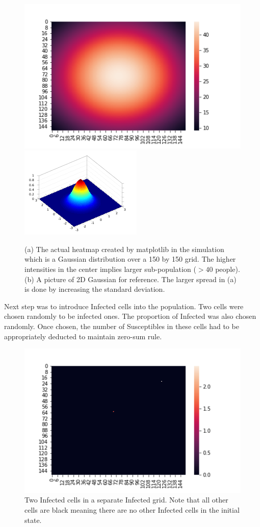 \documentclass[a4paper]{article}
\begin{document}
\begin{figure}[ht]
  \includegraphics[scale=0.4]{../population_dist.png}
  \includegraphics[scale=0.7]{../2dgauss.png}
  \centering
  \caption{(a) The actual heatmap created by matplotlib in the simulation 
    which is a Gaussian distribution over a 150 by 150 grid. The higher intensities
  in the center implies larger sub-population ($> 40$ people). (b) A picture of
2D Gaussian for reference. The larger spread in (a) is done by increasing the
standard deviation. }
\end{figure}

Next step was to introduce Infected cells into the population. Two cells were chosen
randomly to be infected ones. The proportion of Infected was also chosen
randomly. Once chosen, the number of Susceptibles in these cells had to be
appropriately deducted to maintain zero-sum rule.

\begin{figure}[ht]
  \includegraphics[scale=0.70]{../infected_cells.png}
  \centering
  \caption{Two Infected cells in a separate Infected grid. Note that all other cells are black meaning there
  are no other Infected cells in the initial state.}
\end{figure}
\end{document}

